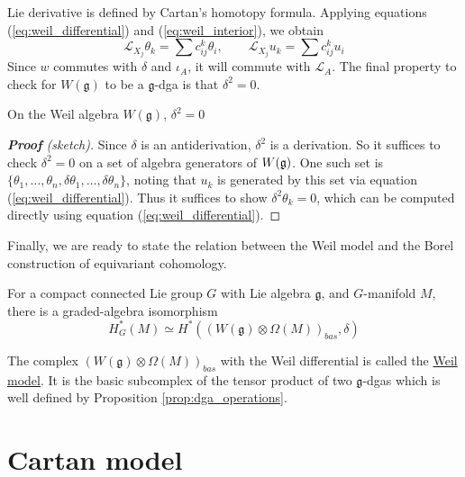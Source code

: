 Lie derivative is defined by Cartan's homotopy formula. 
Applying equations (\ref{eq:weil_differential}) and (\ref{eq:weil_interior}), we
obtain 
\begin{equation} \label{eq:weil_lie}
\mathcal{L}_{X_j} \theta_k = \sum c_{ij}^k \theta_i , \qquad
\mathcal{L}_{X_j}u_k = \sum c_{ij}^k u_i
\end{equation}
Since  $w$ commutes with
 $\delta$ and  $\iota_A$, it will commute with  $\mathcal{L}_A$.
The final property to check for $W(\mathfrak{g})$ to be a  $\mathfrak{g}$-dga
is that  $\delta^2 = 0$. 
\begin{thm} %
	On the Weil algebra $W(\mathfrak{g})$, $\delta^2=0$
\end{thm}
\begin{proof}[\textbf{\textit{Proof}} (sketch)]
	Since $\delta$ is an antiderivation,  $\delta^2$ is a derivation. So it
	suffices to check $\delta^2=0$ on a set of algebra generators of $W(\operatorname{\mathfrak{g}})$.
	One such set is
	$\{\theta_1,\ldots,\theta_n,\delta\theta_1,\ldots,\delta\theta_n\}$, 
	noting that $u_k$ is generated by this set via equation
	(\ref{eq:weil_differential}). Thus it suffices to show  $\delta^2 \theta_k
	= 0$, which can be computed directly using 
	equation (\ref{eq:weil_differential}).
\end{proof}

Finally, we are ready to state the relation between the Weil model and the Borel
construction of equivariant cohomology.
\begin{thm} 
	\label{thm:equivariant_de_Rham} %
	For a compact connected Lie group $G$ with Lie algebra $\mathfrak{g}$, and
	$G$-manifold  $M$, there is a graded-algebra isomorphism 
	 \[
		 H_G^*(M) \simeq H^*((W(\mathfrak{g})\otimes \Omega(M))_{bas}, \delta)
	\] 
\end{thm}
\noindent
The complex $(W(\mathfrak{g})\otimes \Omega(M))_{bas}$ with the Weil
differential is called the \underline{Weil model}. It is the basic subcomplex of
the tensor product of two $\mathfrak{g}$-dgas which is well defined by
Proposition \ref{prop:dga_operations}.


\section{Cartan model}
